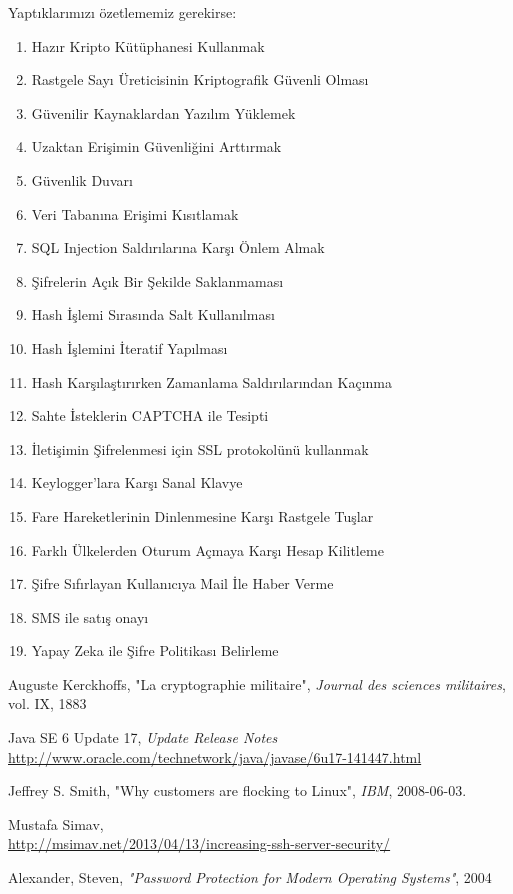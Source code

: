 \documentclass[11pt,a4paper]{report}
\begin{document}
Yaptıklarımızı özetlememiz gerekirse:
\begin{enumerate}
\item Hazır Kripto Kütüphanesi Kullanmak
\item Rastgele Sayı Üreticisinin Kriptografik Güvenli Olması
\item Güvenilir Kaynaklardan Yazılım Yüklemek
\item Uzaktan Erişimin Güvenliğini Arttırmak
\item Güvenlik Duvarı
\item Veri Tabanına Erişimi Kısıtlamak
\item SQL Injection Saldırılarına Karşı Önlem Almak
\item Şifrelerin Açık Bir Şekilde Saklanmaması
\item Hash İşlemi Sırasında Salt Kullanılması
\item Hash İşlemini İteratif Yapılması
\item Hash Karşılaştırırken Zamanlama Saldırılarından Kaçınma
\item Sahte İsteklerin CAPTCHA ile Tesipti
\item İletişimin Şifrelenmesi için SSL protokolünü kullanmak
\item Keylogger'lara Karşı Sanal Klavye
\item Fare Hareketlerinin Dinlenmesine Karşı Rastgele Tuşlar
\item Farklı Ülkelerden Oturum Açmaya Karşı Hesap Kilitleme
\item Şifre Sıfırlayan Kullanıcıya Mail İle Haber Verme
\item SMS ile satış onayı
\item Yapay Zeka ile Şifre Politikası Belirleme
\end{enumerate}

\begin{thebibliography}{9}

  Auguste Kerckhoffs,
  "La cryptographie militaire",
  \emph{Journal des sciences militaires},
  vol. IX,
  1883

  Java SE 6 Update 17, \emph{Update Release Notes} \\
  \url{http://www.oracle.com/technetwork/java/javase/6u17-141447.html}

  Jeffrey S. Smith,
  "Why customers are flocking to Linux",
  \emph{IBM},
  2008-06-03.

  Mustafa Simav, \\
  \url{http://msimav.net/2013/04/13/increasing-ssh-server-security/}

  Alexander, Steven, 
  \emph{"Password Protection for Modern Operating Systems"},
  2004

\end{thebibliography}
\end{document}
